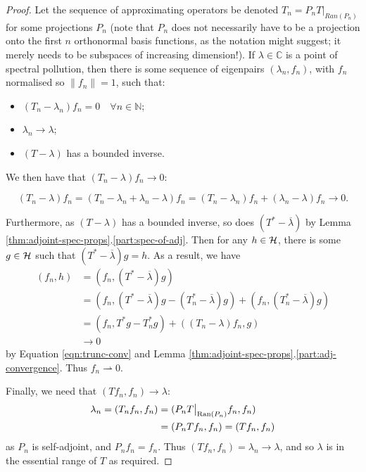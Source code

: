 \documentclass[../main.tex]{subfiles}
\begin{document}
\begin{proof}
Let the sequence of approximating operators be denoted $T_n = P_n
T\big|_{Ran(P_n)}$ for some projections $P_n$ (note that $P_n$ does not
necessarily have to be a projection onto the first $n$ orthonormal basis
functions, as the notation might suggest; it merely needs to be
subspaces of increasing dimension!). If $\lambda \in \mathbb{C}$ is a
point of spectral pollution, then there is some sequence of eigenpairs
$(\lambda_n, f_n)$, with $f_n$ normalised so $\|f_n\| = 1$, such that:
\begin{itemize}
  \item $(T_n - \lambda_n)f_n =0 \quad \forall n \in \mathbb{N}$;
  \item $\lambda_n \rightarrow \lambda$;
  \item $(T - \lambda)$ has a bounded inverse.
\end{itemize}
We then have that $(T_n - \lambda)f_n \rightarrow 0$:

\begin{equation}
\label{eqn:trunc-conv}
(T_n - \lambda)f_n = (T_n - \lambda_n + \lambda_n - \lambda)f_n 
		   = (T_n -\lambda_n)f_n + (\lambda_n - \lambda)f_n 
		   \rightarrow 0. 
\end{equation}

Furthermore, as $(T - \lambda)$ has a bounded inverse, so does $(T^* -
\overline{\lambda})$ by Lemma
\ref{thm:adjoint-spec-props}.\ref{part:spec-of-adj}. Then for any $h \in
\mathcal{H}$, there is some $g \in \mathcal{H}$ such that $(T^* - \overline{\lambda})g = h$.
As a result, we have
\begin{align*}
(f_n, h) & = (f_n, (T^* - \overline{\lambda})g) \\
& = (f_n, (T^* - \overline{\lambda})g - (T_n^* - \overline{\lambda})g) + (f_n, (T_n^* - \overline{\lambda})g) \\
& = (f_n, T^*g - T_n^*g) + ((T_n - \lambda)f_n, g) \\
& \rightarrow 0
\end{align*}
by Equation \ref{eqn:trunc-conv} and Lemma
\ref{thm:adjoint-spec-props}.\ref{part:adj-convergence}. Thus 
$f_n \rightharpoonup 0$.

Finally, we need that $(T f_n, f_n) \rightarrow \lambda$:
\begin{align*}
\lambda_n = (T_n f_n, f_n) & = (P_n T\big|_{\mathrm{Ran}(P_n)} f_n, f_n)  \\
& = (P_n T f_n, f_n) = (T f_n, f_n)
\end{align*}
as $P_n$ is self-adjoint, and $P_n f_n = f_n$. Thus $(T f_n, f_n) = \lambda_n
\rightarrow \lambda$, and so $\lambda$ is in the essential range of $T$ as
required. \end{proof}
\end{document}
